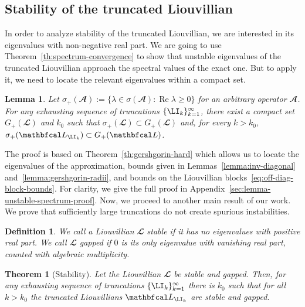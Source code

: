 \documentclass{SciPost}
\renewcommand{\Re}{\operatorname{Re}}
\newtheorem{theorem}{Theorem}
\newtheorem{lemma}{Lemma}
\newtheorem{definition}{Definition}
\begin{document}
\subsection{Stability of the truncated Liouvillian}
In order to analyze stability of the truncated Liouvillian, we are interested in its eigenvalues with non-negative real part. We are going to use Theorem~\ref{th:spectrum-convergence} to show that unstable eigenvalues of the truncated Liouvillian approach the spectral values of the exact one. But to apply it, we need to locate the relevant eigenvalues within a compact set.
\begin{lemma}
    Let $\sigma_+(\mathbfcal A) := \{\lambda \in \sigma(\mathbfcal A): \Re \lambda \geqslant 0\}$ for an arbitrary operator $\mathbfcal A$.
    For any exhausting sequence of truncations $\{\LI_k\}_{k=1}^\infty$, there exist a compact set $G_+(\mathbfcal L)$ and $k_0$ such that $\sigma_+(\mathbfcal L) \subset G_+(\mathbfcal L)$ and, for every $k>k_0$,
    $\sigma_+(\mathbfcal L_{\LI_k}) \subset G_+(\mathbfcal L)$.
    \label{lemma:unstable-spectrum}
\end{lemma}
The proof is based on Theorem~\ref{th:gershgorin-hard} which allows us to locate the eigenvalues of the approximation, bounds given in Lemmas~\ref{lemma:inv-diagonal} and~\ref{lemma:gershgorin-radii}, and bounds on the Liouvillian blocks~\eqref{eq:off-diag-block-bounds}. For clarity, we give the full proof in Appendix~\ref{sec:lemma-unstable-spectrum-proof}. Now, we proceed to another main result of our work. We prove that sufficiently large truncations do not create spurious instabilities.

\begin{definition}
    We call a Liouvillian \(\mathbfcal L\) \emph{stable} if it has no eigenvalues with positive real part. We call \(\mathbfcal L\) \emph{gapped} if \(0\) is its only eigenvalue with vanishing real part, counted with algebraic multiplicity.
\end{definition}

\begin{theorem}[Stability]
    Let the Liouvillian \(\mathbfcal L\) be stable and gapped. Then, for any exhausting sequence of truncations $\{\LI_k\}_{k=1}^{\infty}$ there is $k_0$ such that for all $k > k_0$ the truncated Liouvillians \(\mathbfcal L_{\LI_k}\) are stable and gapped.
    \label{th:stability}
\end{theorem}
\end{document}
